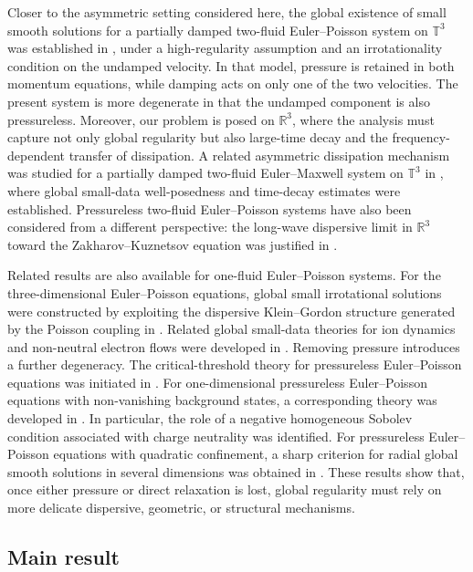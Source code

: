 \documentclass[10pt,reqno]{amsart}
\numberwithin{equation}{section}
\begin{document}
Closer to the asymmetric setting considered here, the global existence of small smooth solutions for a partially damped two-fluid Euler--Poisson system on $\mathbb T^3$ was established in \cite{ZZ19}, under a high-regularity assumption and an irrotationality condition on the undamped velocity. In that model, pressure is retained in both momentum equations, while damping acts on only one of the two velocities. The present system is more degenerate in that the undamped component is also pressureless. Moreover, our problem is posed on $\mathbb R^3$, where the analysis must capture not only global regularity but also large-time decay and the frequency-dependent transfer of dissipation. A related asymmetric dissipation mechanism was studied for a partially damped two-fluid Euler--Maxwell system on $\mathbb T^3$ in \cite{LZ23}, where global small-data well-posedness and time-decay estimates were established. Pressureless two-fluid Euler--Poisson systems have also been considered from a different perspective: the long-wave dispersive limit in $\mathbb R^3$ toward the Zakharov--Kuznetsov equation was justified in \cite{Li21}.


Related results are also available for one-fluid Euler--Poisson systems. For the three-dimensional Euler--Poisson equations, global small irrotational solutions were constructed by exploiting the dispersive Klein--Gordon structure generated by the Poisson coupling in \cite{Guo98}. Related global small-data theories for ion dynamics and non-neutral electron flows were developed in \cite{GP11,GMP13}. Removing pressure introduces a further degeneracy. The critical-threshold theory for pressureless Euler--Poisson equations was initiated in \cite{ELT01}. For one-dimensional pressureless Euler--Poisson equations with non-vanishing background states, a corresponding theory was developed in \cite{CKKT26}. In particular, the role of a negative homogeneous Sobolev condition associated with charge neutrality was identified. For pressureless Euler--Poisson equations with quadratic confinement, a sharp criterion for radial global smooth solutions in several dimensions was obtained in \cite{CS23}. These results show that, once either pressure or direct relaxation is lost, global regularity must rely on more delicate dispersive, geometric,
or structural mechanisms.


%
%
%
%
%
%

\subsection{Main result}
 
\end{document}
